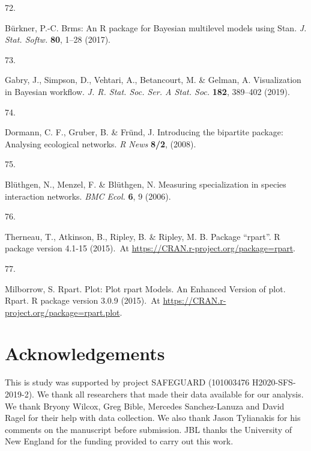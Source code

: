 \documentclass[
  12pt,
  a4paper,
]{article}
\newlength{\cslhangindent}
\newlength{\csllabelwidth}
\newlength{\cslentryspacingunit} %
\newenvironment{CSLReferences}[2] %
 {%
  \setlength{\parindent}{0pt}
  \ifodd #1
  \let\oldpar\par
  \def\par{\hangindent=\cslhangindent\oldpar}
  \fi
  \setlength{\parskip}{#2\cslentryspacingunit}
 }%
 {}
\newcommand{\CSLLeftMargin}[1]{\parbox[t]{\csllabelwidth}{#1}}
\newcommand{\CSLRightInline}[1]{\parbox[t]{\linewidth - \csllabelwidth}{#1}\break}
\begin{document}
\begin{CSLReferences}{0}{0}
\leavevmode{}%
\CSLLeftMargin{72. }
\CSLRightInline{Bürkner, P.-C. Brms: {An R} package for {Bayesian} multilevel models using {Stan}. \emph{J. Stat. Softw.} \textbf{80}, 1--28 (2017).}

\leavevmode{}%
\CSLLeftMargin{73. }
\CSLRightInline{Gabry, J., Simpson, D., Vehtari, A., Betancourt, M. \& Gelman, A. Visualization in {Bayesian} workflow. \emph{J. R. Stat. Soc. Ser. A Stat. Soc.} \textbf{182}, 389--402 (2019).}

\leavevmode{}%
\CSLLeftMargin{74. }
\CSLRightInline{Dormann, C. F., Gruber, B. \& Fründ, J. Introducing the bipartite package: Analysing ecological networks. \emph{R News} \textbf{8/2}, (2008).}

\leavevmode{}%
\CSLLeftMargin{75. }
\CSLRightInline{Blüthgen, N., Menzel, F. \& Blüthgen, N. Measuring specialization in species interaction networks. \emph{BMC Ecol.} \textbf{6}, 9 (2006).}

\leavevmode{}%
\CSLLeftMargin{76. }
\CSLRightInline{Therneau, T., Atkinson, B., Ripley, B. \& Ripley, M. B. Package {``rpart''}. R package version 4.1-15 (2015).~At \href{https://CRAN.R-project.org/package=rpart}{https://CRAN.r-project.org/package=rpart}.}

\leavevmode{}%
\CSLLeftMargin{77. }
\CSLRightInline{Milborrow, S. Rpart. Plot: {Plot} rpart {Models}. {An Enhanced Version} of plot. Rpart. R package version 3.0.9 (2015).~At \href{https://CRAN.R-project.org/package=rpart.plot}{https://CRAN.r-project.org/package=rpart.plot}.}

\end{CSLReferences}

\hypertarget{acknowledgements}{%
\section{Acknowledgements}\label{acknowledgements}}

This is study was supported by project SAFEGUARD (101003476 H2020-SFS-2019-2). We thank all researchers that made their data available for our analysis. We thank Bryony Wilcox, Greg Bible, Mercedes Sanchez-Lanuza and David Ragel for their help with data collection. We also thank Jason Tylianakis for his comments on the manuscript before submission. JBL thanks the University of New England for the funding provided to carry out this work.
\end{document}
